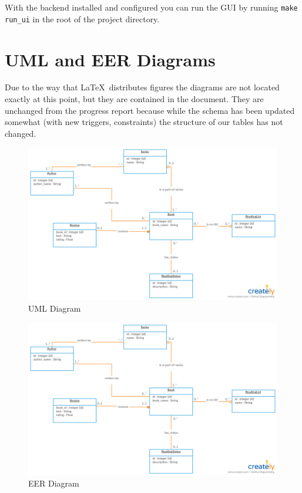 \documentclass{article}
\begin{document}
With the backend installed and configured you can run the GUI
by running \texttt{make run\_ui} in the root of the project directory.

\section*{UML and EER Diagrams}

Due to the way that \LaTeX \ distributes figures
the diagrams are not located exactly at this point,
but they are contained in the document.
They are unchanged from the progress report
because while the schema has been updated somewhat
(with new triggers, constraints)
the structure of our tables has not changed.

\begin{figure}[h]
  \centering
  \includegraphics[width=\textwidth]{uml}
  \caption{UML Diagram}
\end{figure}

\begin{figure}[h]
  \centering
  \includegraphics[width=\textwidth]{uml}
  \caption{EER Diagram}
\end{figure}
\end{document}
